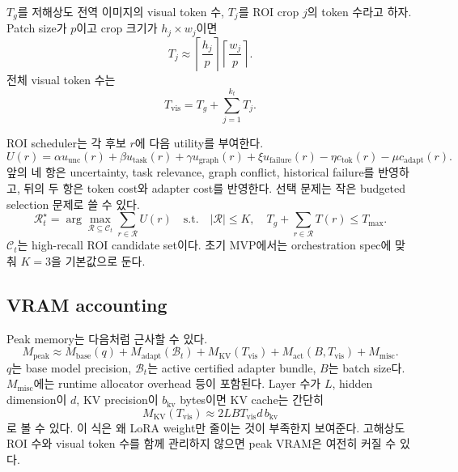 \documentclass[11pt]{article}
\theoremstyle{definition}
\begin{document}
$T_g$를 저해상도 전역 이미지의 visual token 수, $T_j$를 ROI crop $j$의 token 수라고 하자.
Patch size가 $p$이고 crop 크기가 $h_j\times w_j$이면
\begin{equation}
  T_j \approx \left\lceil \frac{h_j}{p} \right\rceil
          \left\lceil \frac{w_j}{p} \right\rceil.
\end{equation}
전체 visual token 수는
\begin{equation}
  T_{\mathrm{vis}} = T_g + \sum_{j=1}^{k_t} T_j.
  \label{eq:tokens-ko}
\end{equation}

ROI scheduler는 각 후보 $r$에 다음 utility를 부여한다.
\begin{equation}
  U(r)
  =
  \alpha u_{\mathrm{unc}}(r)
  + \beta u_{\mathrm{task}}(r)
  + \gamma u_{\mathrm{graph}}(r)
  + \xi u_{\mathrm{failure}}(r)
  - \eta c_{\mathrm{tok}}(r)
  - \mu c_{\mathrm{adapt}}(r).
  \label{eq:roi-utility-ko}
\end{equation}
앞의 네 항은 uncertainty, task relevance, graph conflict, historical failure를 반영하고, 뒤의 두 항은 token cost와 adapter cost를 반영한다.
선택 문제는 작은 budgeted selection 문제로 쓸 수 있다.
\begin{equation}
  \mathcal{R}_t^\star
  =
  \arg\max_{\mathcal{R}\subseteq \mathcal{C}_t}
  \sum_{r\in\mathcal{R}} U(r)
  \quad
  \mathrm{s.t.}
  \quad
  |\mathcal{R}|\le K,\quad
  T_g+\sum_{r\in\mathcal{R}}T(r)\le T_{\max}.
  \label{eq:roi-select-ko}
\end{equation}
$\mathcal{C}_t$는 high-recall ROI candidate set이다.
초기 MVP에서는 orchestration spec에 맞춰 $K=3$을 기본값으로 둔다.

\subsection{VRAM accounting}

Peak memory는 다음처럼 근사할 수 있다.
\begin{equation}
  M_{\mathrm{peak}}
  \approx
  M_{\mathrm{base}}(q)
  + M_{\mathrm{adapt}}(\mathcal{B}_t)
  + M_{\mathrm{KV}}(T_{\mathrm{vis}})
  + M_{\mathrm{act}}(B,T_{\mathrm{vis}})
  + M_{\mathrm{misc}}.
  \label{eq:vram-ko}
\end{equation}
$q$는 base model precision, $\mathcal{B}_t$는 active certified adapter bundle, $B$는 batch size다.
$M_{\mathrm{misc}}$에는 runtime allocator overhead 등이 포함된다.
Layer 수가 $L$, hidden dimension이 $d$, KV precision이 $b_{\mathrm{kv}}$ bytes이면 KV cache는 간단히
\begin{equation}
  M_{\mathrm{KV}}(T_{\mathrm{vis}})
  \approx
  2 L B T_{\mathrm{vis}} d\, b_{\mathrm{kv}}
  \label{eq:kv-ko}
\end{equation}
로 볼 수 있다.
이 식은 왜 LoRA weight만 줄이는 것이 부족한지 보여준다.
고해상도 ROI 수와 visual token 수를 함께 관리하지 않으면 peak VRAM은 여전히 커질 수 있다.
\end{document}
